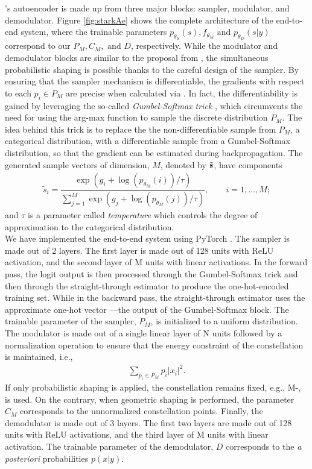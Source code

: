 \citeauthor{Stark}'s autoencoder is made up from three major blocks: sampler, modulator, and demodulator. Figure \ref{fig:starkAe} shows the complete architecture of the end-to-end system, where the trainable parameters $p_{\theta_S}(s), f_{\theta_M} \text{ and } p_{\theta_D}(s|y)$ correspond to our $P_M, C_M, \text{ and } D$, respectively. While the modulator and demodulator blocks are similar to the proposal from \cite{O'Shea}, the simultaneous probabilistic shaping is possible thanks to the careful design of the sampler. By ensuring that the sampler mechanism is differentiable, the gradients with respect to each $p_i \in P_M$ are precise when calculated via . In fact, the differentiability is gained by leveraging the so-called \textit{Gumbel-Softmax trick} \cite{JANG}, which circumvents the need for using the arg-max function to sample the discrete distribution $P_M$. The idea behind this trick is to replace the the non-differentiable sample from $P_M$, a categorical distribution, with a differentiable sample from a Gumbel-Softmax distribution, so that the gradient can be estimated during backpropagation. The generated sample vectors of dimension, $M$, denoted by $\tilde{\vb{s}}$, have components
\begin{align}
	\tilde{s}_i = \dfrac{\exp(g_i + \log(p_{\theta_M}(i))/\tau)}{\sum\limits_{j=1}^M \exp(g_j + \log(p_{\theta_M}(j))/\tau)}, \qquad i=1,\dots,M;
\end{align}
and $\tau$ is a parameter called \textit{temperature} which controls the degree of approximation to the categorical distribution.\\

We have implemented the end-to-end system using PyTorch \cite{PyTorch}. The sampler is made out of 2 layers. The first layer is made out of 128 units with ReLU activation, and the second layer of M units with linear activations. In the forward pass, the logit output is then processed through the Gumbel-Softmax trick and then through the straight-through estimator to produce the one-hot-encoded training set. While in the backward pass, the straight-through estimator uses the approximate one-hot vector ---the output of the Gumbel-Softmax block. The trainable parameter of the sampler, $P_M$, is initialized to a uniform distribution.
The modulator is made out of a single linear layer of N units followed by a normalization operation to ensure that the energy constraint of the constellation is maintained, i.e.,
\begin{align}
	\sum\limits_{p_i \in P_M} p_i |x_i|^2.
\end{align}
If only probabilistic shaping is applied, the constellation remains fixed, e.g., M-, is used. On the contrary, when geometric shaping is performed, the parameter $C_M$ corresponds to the unnormalized constellation points.
Finally, the demodulator is made out of 3 layers. The first two layers are made out of 128 units with ReLU activations, and the third layer of M units with linear activation. The trainable parameter of the demodulator, $D$ corresponds to the \textit{a posteriori} probabilities $p(x|y)$.

